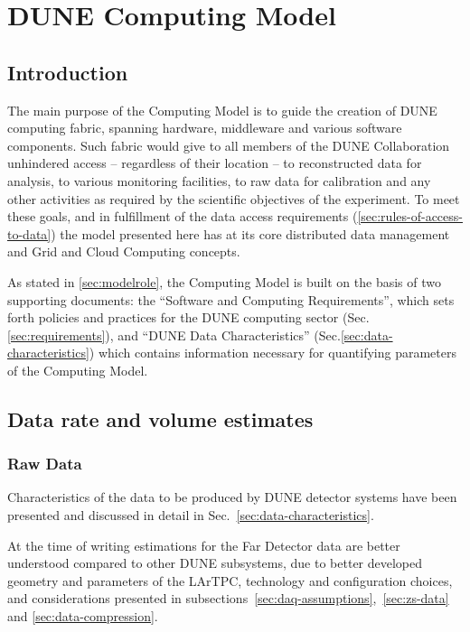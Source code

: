 \section{DUNE Computing Model}
\label{sec:computing_model}

\subsection{Introduction}
The main purpose of the Computing Model is to guide the creation of DUNE computing fabric, spanning
hardware, middleware and various software components. Such fabric would give to all members of the DUNE
Collaboration unhindered access -- regardless of their location -- to reconstructed data for analysis, to various monitoring facilities,
to raw data for calibration and any other activities as required by the scientific objectives of the experiment. To meet these goals,
and in fulfillment of the data access requirements (\ref{sec:rules-of-access-to-data})
the model presented here has at  its core distributed data management and Grid and Cloud Computing concepts.

As stated in \ref{sec:modelrole}, the Computing Model is built on the basis of two supporting documents: the
``Software and Computing Requirements'', which sets forth policies and practices for the DUNE computing sector
(Sec.\ref{sec:requirements}), and ``DUNE Data Characteristics'' (Sec.\ref{sec:data-characteristics}) which contains information
necessary for quantifying parameters of the Computing Model.

\subsection{Data rate and volume estimates}
\subsubsection{Raw Data}
Characteristics of the data to be produced by DUNE detector systems have been presented and discussed in
detail in Sec.~\ref{sec:data-characteristics}.

At the time of writing estimations for the Far Detector data are better understood compared to other DUNE subsystems,
due to better developed geometry and parameters of the LArTPC, technology and configuration choices, and considerations
presented in subsections~\ref{sec:daq-assumptions},~\ref{sec:zs-data} and \ref{sec:data-compression}.

